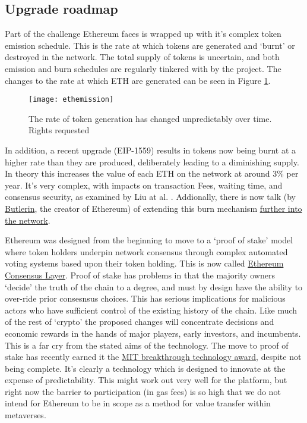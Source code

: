 \subsection{Upgrade roadmap}
Part of the challenge Ethereum faces is wrapped up with it's complex token emission schedule. This is the rate at which tokens are generated and `burnt' or destroyed in the network. The total supply of tokens is uncertain, and both emission and burn schedules are regularly tinkered with by the project. The changes to the rate at which ETH are generated can be seen in Figure \ref{fig:ethemission}.
\begin{figure}
  \centering
    \texttt{[image: ethemission]}
  \caption{The rate of token generation has changed unpredictably over time. Rights requested}
  \label{fig:ethemission}
\end{figure}
In addition, a recent upgrade (EIP-1559) results in tokens now being burnt at a higher rate than they are produced, deliberately leading to a diminishing supply. In theory this increases the value of each ETH on the network at around 3\% per year. It's very complex, with impacts on transaction Fees, waiting time, and consensus security, as examined by Liu at al. \cite{liu2022empirical}. Addionally, there is now talk (by \href{https://time.com/6158182/vitalik-buterin-ethereum-profile/}{Butlerin}, the creator of Ethereum) of extending this burn mechanism \href{https://ethresear.ch/t/multidimensional-eip-1559/11651}{further into the network}.\par
Ethereum was designed from the beginning to move to a `proof of stake' model where token holders underpin network consensus through complex automated voting systems based upon their token holding. This is now called \href{https://blog.ethereum.org/2022/01/24/the-great-eth2-renaming/}{Ethereum Consensus Layer}. Proof of stake has problems in that the majority owners `decide' the truth of the chain to a degree, and must by design have the ability to over-ride prior consesnsus choices. This has serious implications for malicious actors who have sufficient control of the existing history of the chain. Like much of the rest of `crypto' the proposed changes will concentrate decisions and economic rewards in the hands of major players, early investors, and incumbents. This is a far cry from the stated aims of the technology. The move to proof of stake has recently earned it the \href{https://www.technologyreview.com/2022/02/23/1044960/proof-of-stake-cryptocurrency/}{MIT breakthrough technology award}, despite not being complete. It's clearly a technology which is designed to innovate at the expense of predictability. This might work out very well for the platform, but right now the barrier to participation (in gas fees) is so high that we do not intend for Ethereum to be in scope as a method for value transfer within metaverses.\par



